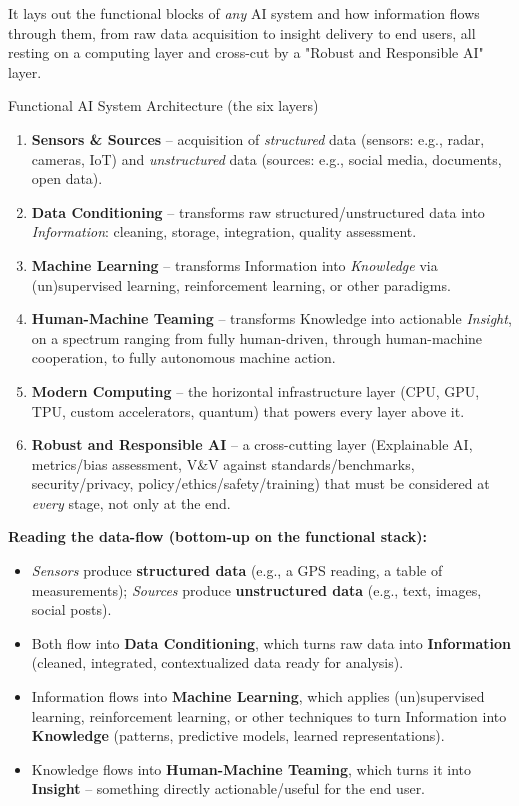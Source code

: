 It lays out the functional blocks of \emph{any} AI system and how information flows through them, from raw data acquisition to insight delivery to end users, all resting on a computing layer and cross-cut by a "Robust and Responsible AI" layer.

\begin{defbox}{Functional AI System Architecture (the six layers)}
\begin{enumerate}
    \item \textbf{Sensors \& Sources} -- acquisition of \emph{structured} data (sensors: e.g., radar, cameras, IoT) and \emph{unstructured} data (sources: e.g., social media, documents, open data).
    \item \textbf{Data Conditioning} -- transforms raw structured/unstructured data into \emph{Information}: cleaning, storage, integration, quality assessment.
    \item \textbf{Machine Learning} -- transforms Information into \emph{Knowledge} via (un)supervised learning, reinforcement learning, or other paradigms.
    \item \textbf{Human-Machine Teaming} -- transforms Knowledge into actionable \emph{Insight}, on a spectrum ranging from fully human-driven, through human-machine cooperation, to fully autonomous machine action.
    \item \textbf{Modern Computing} -- the horizontal infrastructure layer (CPU, GPU, TPU, custom accelerators, quantum) that powers every layer above it.
    \item \textbf{Robust and Responsible AI} -- a cross-cutting layer (Explainable AI, metrics/bias assessment, V\&V against standards/benchmarks, security/privacy, policy/ethics/safety/training) that must be considered at \emph{every} stage, not only at the end.
\end{enumerate}
\end{defbox}

\textbf{Reading the data-flow (bottom-up on the functional stack):}

\begin{itemize}
    \item \emph{Sensors} produce \textbf{structured data} (e.g., a GPS reading, a table of measurements); \emph{Sources} produce \textbf{unstructured data} (e.g., text, images, social posts).
    \vspace{0.2cm}
    \item Both flow into \textbf{Data Conditioning}, which turns raw data into \textbf{Information} (cleaned, integrated, contextualized data ready for analysis).
    \vspace{0.2cm}
    \item Information flows into \textbf{Machine Learning}, which applies (un)supervised learning, reinforcement learning, or other techniques to turn Information into \textbf{Knowledge} (patterns, predictive models, learned representations).
    \vspace{0.2cm}
    \item Knowledge flows into \textbf{Human-Machine Teaming}, which turns it into \textbf{Insight} -- something directly actionable/useful for the end user.
\end{itemize}

